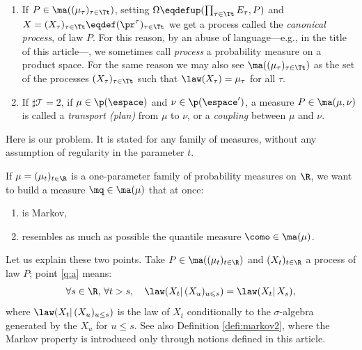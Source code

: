 \skpt
\begin{reminder}\label{remind:processus_canonique}
\begin{enumerate}
\item
\label{item:processus_canonique} If $P\in\ma((\mu_\tau)_{\tau\in\Tt})$, setting $\Omega\eqdefup(\prod_{\tau\in\Tt}E_\tau,P)$ and $X=(X_\tau)_{\tau\in \Tt}\eqdef(\pr^\tau)_{\tau\in \Tt}$ we get a process called the \emph{canonical process}, of law $P$. For this reason, by an abuse of language---e.g., in the title of this article---, we sometimes call \emph{process} a probability measure on a product space. For the same reason we may also see $\ma((\mu_\tau)_{\tau\in\Tt})$ as the set of the processes $(X_\tau)_{\tau\in\Tt}$ such that $\law(X_\tau)=\mu_\tau$ for all $\tau$.

\item
If $\sharp{\mathcal T}=2$, \ie if $\mu\in\p(\espace)$ and $\nu\in\p(\espace')$, a measure $P\in\ma(\mu,\nu)$ is called a \emph{transport (plan)} from $\mu$ to $\nu$, or a \emph{coupling} between $\mu$ and $\nu$.
\end{enumerate}
\end{reminder}

Here is our problem. It is stated for any family of measures, without any assumption of regularity in the parameter $t$.

\begin{problem*}\label{problem} If $\mu=(\mu_t)_{t\in\R}$ is a one-parameter family of probability measures on $\R$, we want to build a measure $\mq\in\ma(\mu)$ that at once:
\begin{enumerate}
\item\label{q:a}
is Markov,
\item\label{q:b}
resembles as much as possible the quantile measure $\como\in\ma(\mu)$.
\end{enumerate}
\end{problem*}

Let us explain these two points. Take $P\in\ma((\mu_t)_{t\in\R})$ and $(X_{t})_{t\in\R}$ a process of law $P$; point \eqref{q:a} means:
\begin{equation}\label{eq:def_markovien}
\forall s\in\R,\,\forall t>s,\quad \law(X_t|\,(X_{u})_{u\leqslant s})=\law(X_t|\,X_s),
\end{equation}
where $\law(X_t|\,(X_u)_{u\leq s})$ is the law of $X_t$ conditionally to the $\sigma$-algebra generated by the $X_u$ for $u\leq s$. See also Definition \ref{defi:markov2}, where the Markov property is introduced only through notions defined in this article.

